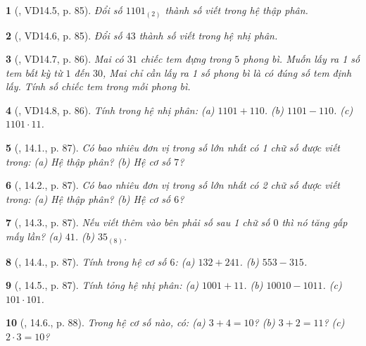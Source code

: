 \documentclass{article}
\newtheorem{baitoan}{}
\begin{document}
\begin{baitoan}[\cite{TLCT_THCS_Toan_6_so_hoc}, VD14.5, p. 85]
	Đổi số $1101_{(2)}$ thành số viết trong hệ thập phân.
\end{baitoan}

\begin{baitoan}[\cite{TLCT_THCS_Toan_6_so_hoc}, VD14.6, p. 85]
	Đổi số $43$ thành số viết trong hệ nhị phân.
\end{baitoan}

\begin{baitoan}[\cite{TLCT_THCS_Toan_6_so_hoc}, VD14.7, p. 86]
	Mai có $31$ chiếc tem đựng trong $5$ phong bì. Muốn lấy ra 1 số tem bất kỳ từ $1$ đến $30$, Mai chỉ cần lấy ra 1 số phong bì là có đúng số tem định lấy. Tính số chiếc tem trong mỗi phong bì.
\end{baitoan}

\begin{baitoan}[\cite{TLCT_THCS_Toan_6_so_hoc}, VD14.8, p. 86]
	Tính trong hệ nhị phân: (a) $1101 + 110$. (b) $1101 - 110$. (c) $1101\cdot11$.
\end{baitoan}

\begin{baitoan}[\cite{TLCT_THCS_Toan_6_so_hoc}, 14.1., p. 87]
	Có bao nhiêu đơn vị trong số lớn nhất có 1 chữ số được viết trong: (a) Hệ thập phân? (b) Hệ cơ số $7$?
\end{baitoan}

\begin{baitoan}[\cite{TLCT_THCS_Toan_6_so_hoc}, 14.2., p. 87]
	Có bao nhiêu đơn vị trong số lớn nhất có 2 chữ số được viết trong: (a) Hệ thập phân? (b) Hệ cơ số $6$?
\end{baitoan}

\begin{baitoan}[\cite{TLCT_THCS_Toan_6_so_hoc}, 14.3., p. 87]
	Nếu viết thêm vào bên phải số sau 1 chữ số $0$ thì nó tăng gấp mấy lần? (a) $41$. (b) $35_{(8)}$.
\end{baitoan}

\begin{baitoan}[\cite{TLCT_THCS_Toan_6_so_hoc}, 14.4., p. 87]
	Tính trong hệ cơ số $6$: (a) $132 + 241$. (b) $553 - 315$.
\end{baitoan}

\begin{baitoan}[\cite{TLCT_THCS_Toan_6_so_hoc}, 14.5., p. 87]
	Tính tỏng hệ nhị phân: (a) $1001 + 11$. (b) $10010 - 1011$. (c) $101\cdot101$.
\end{baitoan}

\begin{baitoan}[\cite{TLCT_THCS_Toan_6_so_hoc}, 14.6., p. 88]
	Trong hệ cơ số nào, có: (a) $3 + 4 = 10$? (b) $3 + 2 = 11$? (c) $2\cdot3 = 10$?
\end{baitoan}
\end{document}
